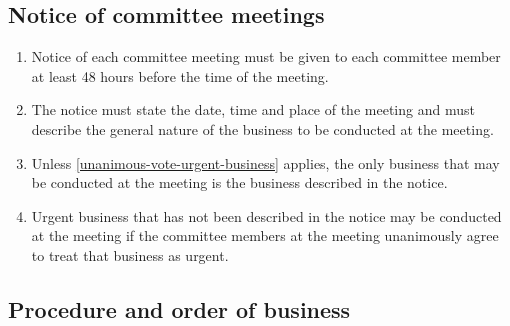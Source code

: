 \documentclass[../constitution.tex]{subfiles}
\begin{document}
\hypertarget{notice-of-committee-meetings}{%
\subsection{Notice of committee meetings}\label{notice-of-committee-meetings}}

\begin{enumerate}

\item Notice of each committee meeting must be given to each committee member at least 48 hours before the time of the meeting.
\item The notice must state the date, time and place of the meeting and must describe the general nature of the business to be conducted at the meeting.
\item Unless  \ref{unanimous-vote-urgent-business} applies, the only business that may be conducted at the meeting is the business described in the notice.
\item Urgent business that has not been described in the notice may be conducted at the meeting if the committee members at the meeting unanimously agree to treat that business as urgent. \label{unanimous-vote-urgent-business}
\end{enumerate}

\hypertarget{procedure-and-order-of-business}{%
\subsection{Procedure and order of business}\label{procedure-and-order-of-business}}
\end{document}
